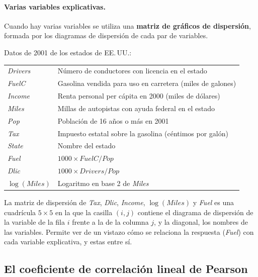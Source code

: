 \paragraph{Varias variables explicativas.} Cuando hay varias variables se utiliza una
\textbf{matriz de gráficos de dispersión}, formada por los diagramas de dispersión de cada par
de variables.

\begin{ejemplo}
  Datos de 2001 de los estados de EE.\,UU.:
  \begin{center}
    \small
    \begin{tabular}{ll}
      \toprule
      \textit{Drivers} & Número de conductores con licencia en el estado \\
      \textit{FuelC}   & Gasolina vendida para uso en carretera (miles de galones) \\
      \textit{Income}  & Renta personal per cápita en 2000 (miles de dólares) \\
      \textit{Miles}   & Millas de autopistas con ayuda federal en el estado \\
      \textit{Pop}     & Población de 16 años o más en 2001 \\
      \textit{Tax}     & Impuesto estatal sobre la gasolina (céntimos por galón) \\
      \textit{State}   & Nombre del estado \\
      \midrule
      \textit{Fuel}    & $1000\times \textit{FuelC}/\textit{Pop}$ \\
      \textit{Dlic}    & $1000\times \textit{Drivers}/\textit{Pop}$ \\
      $\log(\textit{Miles})$ & Logaritmo en base 2 de \textit{Miles} \\
      \bottomrule
    \end{tabular}
  \end{center}
  La matriz de dispersión de \textit{Tax}, \textit{Dlic}, \textit{Income},
  $\log(\textit{Miles})$ y \textit{Fuel} es una cuadrícula $5\times5$ en la que la casilla
  $(i,j)$ contiene el diagrama de dispersión de la variable de la fila $i$ frente a la de la
  columna $j$, y la diagonal, los nombres de las variables. Permite ver de un vistazo cómo se
  relaciona la respuesta (\textit{Fuel}) con cada variable explicativa, y estas entre sí.
\end{ejemplo}

\subsection{El coeficiente de correlación lineal de Pearson}
\label{sec:t1-correlacion}


